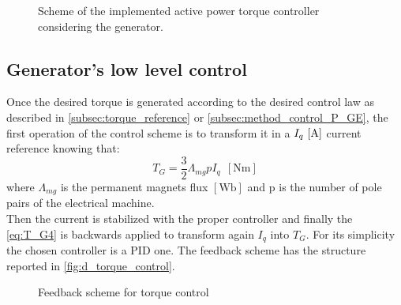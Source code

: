 \begin{figure}[htb]
  \centering
  
  \caption{Scheme of the implemented active power torque controller considering the generator.}
  \label{fig:d_torque_control_GE}
\end{figure}

\subsection{Generator's low level control}\label{subsec:generator_low_level-control}
Once the desired torque is generated according to the desired control law as described in \autoref{subsec:torque_reference} or \autoref{subsec:method_control_P_GE}, the first operation of the control scheme is to transform it in a $I_q \, \left[\si{\ampere}\right]$ current reference knowing that:
\begin{equation}
    T_G = \frac{3}{2}\Lambda_{mg} p I_q \ \ \left[\si{\newton\meter}\right]
    \label{eq:T_G4}
\end{equation}
where $\Lambda_{mg}$ is the permanent magnets flux $\left[\si{\weber}\right]$ and p is the number of pole pairs of the electrical machine.\\
Then the current is stabilized with the proper controller and finally the \autoref{eq:T_G4} is backwards applied to transform again $I_q$ into $T_G$. For its simplicity the chosen controller is a \acrfull{PID} one. The feedback scheme has the structure reported in \autoref{fig:d_torque_control}.

\begin{figure}[htb]
    \centering
    
    \caption{Feedback scheme for torque control}
    \label{fig:d_torque_control}
\end{figure}


